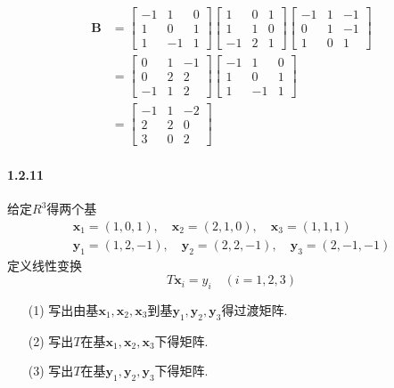 \documentclass[12pt, a4paper, oneside, fontset=none]{ctexart}
\begin{document}
\begin{align*}
    \bm{B} & = \begin{bmatrix}
                   -1 & 1  & 0 \\
                   1  & 0  & 1 \\
                   1  & -1 & 1
               \end{bmatrix}\begin{bmatrix}
                                1  & 0 & 1 \\
                                1  & 1 & 0 \\
                                -1 & 2 & 1
                            \end{bmatrix}\begin{bmatrix}
                                             -1 & 1 & -1 \\
                                             0  & 1 & -1 \\
                                             1  & 0 & 1
                                         \end{bmatrix} \\
           & = \begin{bmatrix}
                   0  & 1 & -1 \\
                   0  & 2 & 2  \\
                   -1 & 1 & 2
               \end{bmatrix} \begin{bmatrix}
                                 -1 & 1  & 0 \\
                                 1  & 0  & 1 \\
                                 1  & -1 & 1
                             \end{bmatrix}             \\
           & = \begin{bmatrix}
                   -1 & 1 & -2 \\
                   2  & 2 & 0  \\
                   3  & 0 & 2
               \end{bmatrix}
\end{align*}

\paragraph*{1.2.11} 给定$R^3$得两个基
\begin{gather*}
    \bm{x}_1 = (1,0,1), \quad \bm{x}_2 = (2,1,0), \quad \bm{x}_3 = (1,1,1) \\
    \bm{y}_1 = (1,2,-1), \quad \bm{y}_2 = (2,2,-1), \quad \bm{y}_3 = (2,-1,-1)
\end{gather*}
定义线性变换
\[
    T\bm{x}_i = y_i \quad (i = 1,2,3)
\]
\begin{enumerate}
    \item[(1)] 写出由基$\bm{x}_1, \bm{x}_2, \bm{x}_3$到基$\bm{y}_1, \bm{y}_2, \bm{y}_3$得过渡矩阵.
    \item[(2)] 写出$T$在基$\bm{x}_1, \bm{x}_2, \bm{x}_3$下得矩阵.
    \item[(3)] 写出$T$在基$\bm{y}_1, \bm{y}_2, \bm{y}_3$下得矩阵.
\end{enumerate}
\end{document}
